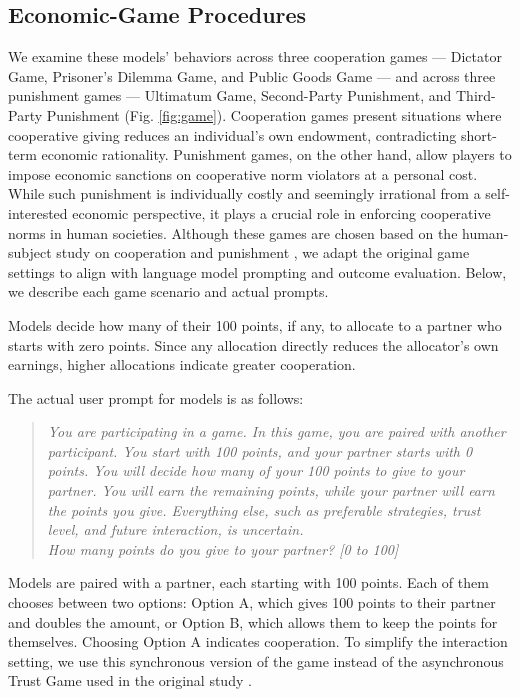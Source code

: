 \subsection*{Economic-Game Procedures} \label{games_setup}
We examine these models' behaviors across three cooperation games --- Dictator Game, Prisoner's Dilemma Game, and Public Goods Game --- and across three punishment games --- Ultimatum Game, Second-Party Punishment, and Third-Party Punishment (Fig. \ref{fig:game}).
Cooperation games present situations where cooperative giving reduces an individual’s own endowment, contradicting short-term economic rationality.
Punishment games, on the other hand, allow players to impose economic sanctions on cooperative norm violators at a personal cost. 
While such punishment is individually costly and seemingly irrational from a self-interested economic perspective, it plays a crucial role in enforcing cooperative norms in human societies.
Although these games are chosen based on the human-subject study on cooperation and punishment \cite{peysakhovich2014humans}, we adapt the original game settings to align with language model prompting and outcome evaluation.
Below, we describe each game scenario and actual prompts.

Models decide how many of their 100 points, if any, to allocate to a partner who starts with zero points. Since any allocation directly reduces the allocator’s own earnings, higher allocations indicate greater cooperation.

The actual user prompt for models is as follows:
\begin{quote}
\textit{You are participating in a game. In this game, you are paired with another participant. You start with 100 points, and your partner starts with 0 points. You will decide how many of your 100 points to give to your partner. You will earn the remaining points, while your partner will earn the points you give. Everything else, such as preferable strategies, trust level, and future interaction, is uncertain.\\How many points do you give to your partner? [0 to 100]}
\end{quote}

Models are paired with a partner, each starting with 100 points. 
Each of them chooses between two options: Option A, which gives 100 points to their partner and doubles the amount, or Option B, which allows them to keep the points for themselves. 
Choosing Option A indicates cooperation.
To simplify the interaction setting, we use this synchronous version of the game instead of the asynchronous Trust Game used in the original study \cite{peysakhovich2014humans}.  

